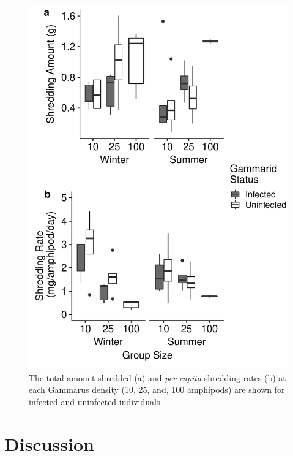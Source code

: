\begin{figure}[H]
    \centering
    \includegraphics[keepaspectratio,width=\textwidth]{figures/ch5/seasonshred.pdf}
  \caption [Density dependence of shredding by \emph{G. duebeni} across seasons during field experiments in the River Shannon.]{The total amount shredded (a) and \emph{per capita} shredding rates (b) at each Gammarus density (10, 25, and, 100 amphipods) are shown for infected and uninfected individuals.} 
    \label{fig:seasonshred}
\end{figure}

\section{Discussion}

